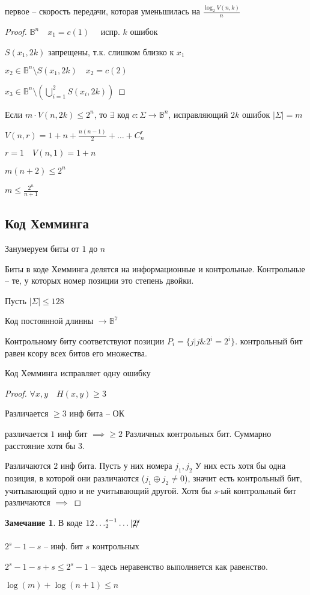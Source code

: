 \documentclass{book}
\theoremstyle{definition}
\newtheorem*{note}{Замечание}
\begin{document}
    первое -- скорость передачи, которая уменьшилась на $\frac{\log _2 V(n, k)}{n}$
\begin{proof}
    $\mathbb{B}^n\quad x_1= c(1)\quad $ испр.  $k$ ошибок

    $S(x_1, 2k)$ запрещены, т.к. слишком близко к $x_1$

    $x_2\in \mathbb{B}^n \setminus S(x_1, 2k)\quad x_2 = c(2)$

    $x_3\in \mathbb{B}^n\setminus \left( \bigcup\limits_{i=1}^{2} S(x_i, 2k) \right) $
\end{proof}

\begin{theorem} 
    Если $m\cdot V(n, 2k)\leqslant 2^n$, то $\exists $ код $c:\Sigma \to \mathbb{B}^n$, исправляющий $2k$ ошибок  $|\Sigma| = m$
\end{theorem}
    $V(n,r) = 1+n+ \frac{n(n-1)}{2} +\ldots + C_n^r$

    $r=1\quad V(n, 1) = 1+n$

    $m(n+2)\leqslant 2^n$

    $m\leqslant \frac{2^n}{n+1}$

\subsection{Код Хемминга}

Занумеруем биты от $1$ до  $n$

Биты в коде Хемминга делятся на информационные и контрольные. Контрольные -- те, у которых номер позиции это степень двойки.

Пусть $\left| \Sigma \right| \leqslant 128$

Код постоянной длинны $\to \mathbb{B}^7$

Контрольному биту соответствуют позиции $P_i = \{j|j\&2^i = 2^i\}$. контрольный бит равен ксору всех битов его множества. 

\begin{theorem}
     Код Хемминга исправляет одну ошибку
\end{theorem}
\begin{proof}
    

     $\forall x, y\quad H(x, y)\geqslant 3$

     Различается $\geqslant 3$ инф бита -- ОК

     различается  $1$ инф бит  $\implies \geqslant 2$ Различных контрольных бит. Суммарно расстояние хотя бы 3.

     Различаются $2$ инф бита. Пусть у них номера  $j_1, j_2$ У них есть хотя бы одна позиция, в которой они различаются ($j_1\oplus j_2\neq 0$), значит есть контрольный бит, учитывающий одно и не учитывающий другой. Хотя бы $s$-ый контрольный бит различаются  $\implies $ 
\end{proof}

\begin{note}
    В коде $12\ldots_2^{s-1}\ldots|\xout{2^s}$

    $2^s-1-s$ -- инф. бит  $s$ контрольных

     $2^s-1-s+s\leqslant 2^s-1$ -- здесь неравенство выполняется как равенство.

     $\log (m) + \log (n+1)\leqslant n$
\end{note}
   
\end{document}
